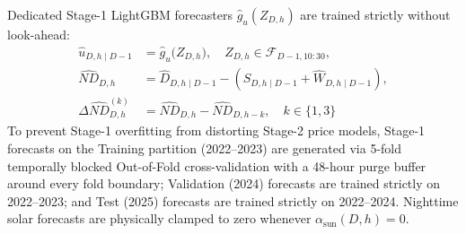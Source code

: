 \documentclass[runningheads,a4paper]{llncs}
\begin{document}
Dedicated Stage-1 LightGBM forecasters $\hat{g}_u(Z_{D,h})$ are trained strictly without look-ahead:
\begin{equation}
\begin{aligned}
\hat{u}_{D,h \mid D-1} &= \hat{g}_u\big(Z_{D,h}\big), \quad Z_{D,h} \in \mathcal{F}_{D-1, 10:30}, \\
\widehat{ND}_{D,h} &= \hat{D}_{D,h \mid D-1} - \left(\hat{S}_{D,h \mid D-1} + \hat{W}_{D,h \mid D-1}\right), \\
\Delta \widehat{ND}_{D,h}^{(k)} &= \widehat{ND}_{D,h} - \widehat{ND}_{D,h-k}, \quad k \in \{1, 3\}
\end{aligned}
\label{eq:stage1_recon}
\end{equation}
To prevent Stage-1 overfitting from distorting Stage-2 price models, Stage-1 forecasts on the Training partition (2022--2023) are generated via 5-fold temporally blocked Out-of-Fold cross-validation with a 48-hour purge buffer around every fold boundary; Validation (2024) forecasts are trained strictly on 2022--2023; and Test (2025) forecasts are trained strictly on 2022--2024. Nighttime solar forecasts are physically clamped to zero whenever $\alpha_{\text{sun}}(D,h) = 0$.
\end{document}
